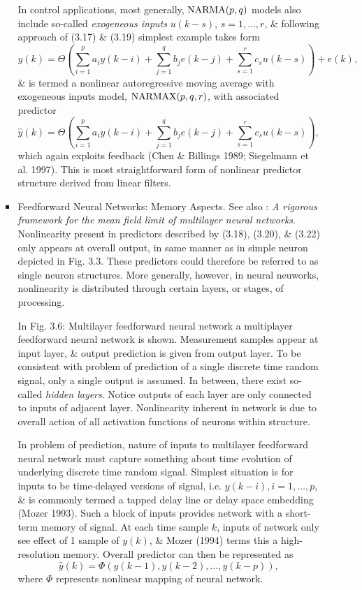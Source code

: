 \documentclass{article}
\begin{document}
\begin{enumerate}
\begin{itemize}
\begin{itemize}
			In control applications, most generally, ${\rm NARMA}(p,q)$ models also include so-called {\it exogeneous inputs} $u(k - s)$, $s = 1,\ldots,r$, \& following approach of (3.17) \& (3.19) simplest example takes form
			\begin{equation}
				y(k) = \Theta\left(\sum_{i=1}^p a_iy(k - i) + \sum_{j=1}^q b_je(k - j) + \sum_{s=1}^r c_su(k - s)\right) + e(k),
			\end{equation}
			\& is termed a nonlinear autoregressive moving average with exogeneous inputs model, ${\rm NARMAX}(p,q,r)$, with associated predictor
			\begin{equation}
				\hat{y}(k) = \Theta\left(\sum_{i=1}^p a_iy(k - i) + \sum_{j=1}^q b_je(k - j) + \sum_{s=1}^r c_su(k - s)\right),
			\end{equation}
			which again exploits feedback (Chen \& Billings 1989; Siegelmann et al. 1997). This is most straightforward form of nonlinear predictor structure derived from linear filters.
			\item {\sf Feedforward Neural Networks: Memory Aspects.} See also \cite{Nguyen_Pham2023}: {\it A rigorous framework for the mean field limit of multilayer neural networks}. Nonlinearity present in predictors described by (3.18), (3.20), \& (3.22) only appears at overall output, in same manner as in simple neuron depicted in Fig. 3.3. These predictors could therefore be referred to as single neuron structures. More generally, however, in neural neuworks, nonlinearity is distributed through certain layers, or stages, of processing.
			
			In {\sf Fig. 3.6: Multilayer feedforward neural network} a multiplayer feedforward neural network is shown. Measurement samples appear at input layer, \& output prediction is given from output layer. To be consistent with problem of prediction of a single discrete time random signal, only a single output is assumed. In between, there exist so-called {\it hidden layers}. Notice outputs of each layer are only connected to inputs of adjacent layer. Nonlinearity inherent in network is due to overall action of all activation functions of neurons within structure.
				
			In problem of prediction, nature of inputs to multilayer feedforward neural network must capture something about time evolution of underlying discrete time random signal. Simplest situation is for inputs to be time-delayed versions of signal, i.e. $y(k - i),i = 1,\ldots,p$, \& is commonly termed a tapped delay line or delay space embedding (Mozer 1993). Such a block of inputs provides network with a short-term memory of signal. At each time sample $k$, inputs of network only see effect of 1 sample of $y(k)$, \& Mozer (1994) terms this a high-resolution memory. Overall predictor can then be represented as
			\begin{equation}
				\hat{y}(k) = \Phi(y(k - 1),y(k - 2),\ldots,y(k - p)),
			\end{equation}
			where $\Phi$ represents nonlinear mapping of neural network.
			

\end{itemize}
\end{itemize}
\end{enumerate}
\end{document}
